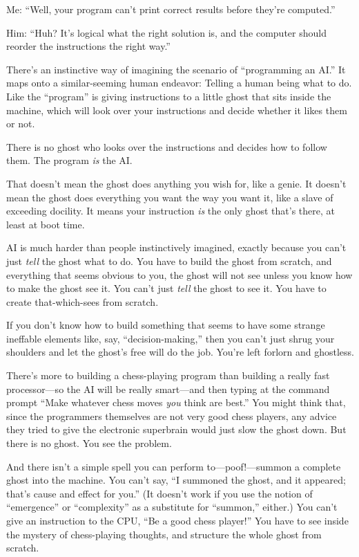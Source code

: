 {
 Me: ``Well, your program can't
print correct results before they're
computed.''}

{
 Him: ``Huh? It's logical what the
right solution is, and the computer should reorder the instructions the
right way.''}

{
 There's an instinctive way of imagining the
scenario of ``programming an AI.''
It maps onto a similar-seeming human endeavor: Telling a human being
what to do. Like the ``program'' is
giving instructions to a little ghost that sits inside the machine,
which will look over your instructions and decide whether it likes them
or not.}

{
 There is no ghost who looks over the instructions and decides how
to follow them. The program \textit{is} the AI.}

{
 That doesn't mean the ghost does anything you wish
for, like a genie. It doesn't mean the ghost does
everything you want the way you want it, like a slave of exceeding
docility. It means your instruction \textit{is} the only ghost
that's there, at least at boot time.}

{
 AI is much harder than people instinctively imagined, exactly
because you can't just \textit{tell} the ghost what to
do. You have to build the ghost from scratch, and everything that seems
obvious to you, the ghost will not see unless you know how to make the
ghost see it. You can't just \textit{tell} the ghost to
see it. You have to create that-which-sees from scratch.}

{
 If you don't know how to build something that
seems to have some strange ineffable elements like, say,
``decision-making,'' then you
can't just shrug your shoulders and let the
ghost's free will do the job. You're
left forlorn and ghostless.}

{
 There's more to building a chess-playing program
than building a really fast processor---so the AI will be really
smart---and then typing at the command prompt ``Make
whatever chess moves \textit{you} think are best.''
You might think that, since the programmers themselves are not very
good chess players, any advice they tried to give the electronic
superbrain would just slow the ghost down. But there is no ghost. You
see the problem.}

{
 And there isn't a simple spell you can perform
to---poof!---summon a complete ghost into the machine. You
can't say, ``I summoned the ghost, and
it appeared; that's cause and effect for
you.'' (It doesn't work if you use
the notion of ``emergence'' or
``complexity'' as a substitute for
``summon,'' either.) You
can't give an instruction to the CPU,
``Be a good chess player!'' You have
to see inside the mystery of chess-playing thoughts, and structure the
whole ghost from scratch.}

